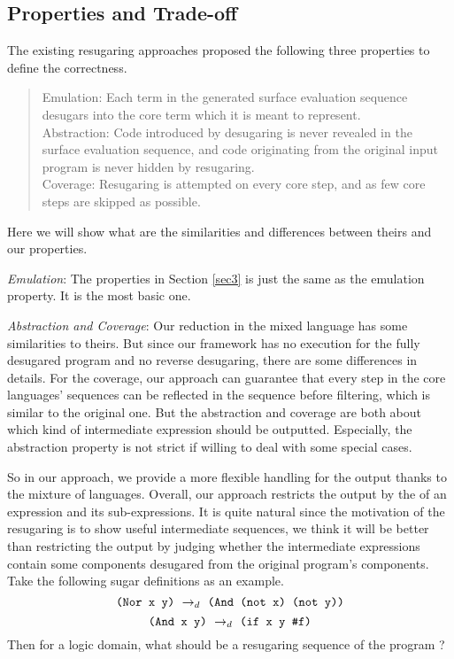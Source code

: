 \subsection{Properties and Trade-off}
\label{mark:correctness}

\todo{}

The existing resugaring approaches \cite{resugaring,hygienic} proposed the following three properties to define the correctness.

\begin{quote}
Emulation:
Each term in the generated surface evaluation sequence desugars into the core term which it is meant to represent.\\
Abstraction:
Code introduced by desugaring is never revealed in the surface evaluation sequence, and code originating from the original input program is never hidden by resugaring.\\
Coverage: Resugaring is attempted on every core step, and as few core steps are skipped as possible.\\
\end{quote}
Here we will show what are the similarities and differences between theirs and our properties.

\emph{Emulation}: The properties in Section \ref{sec3} is just the same as the emulation property. It is the most basic one.

\emph{Abstraction and Coverage}: Our reduction in the mixed language has some similarities to theirs. But since our framework has no execution for the fully desugared program and no reverse desugaring, there are some differences in details. For the coverage, our approach can guarantee that every step in the core languages' sequences can be reflected in the sequence before filtering, which is similar to the original one. But the abstraction and coverage are both about which kind of intermediate expression should be outputted. Especially, the abstraction property is not strict if willing to deal with some special cases.

So in our approach, we provide a more flexible handling for the output thanks to the mixture of languages. Overall, our approach restricts the output by the  of an expression and its sub-expressions. It is quite natural since the motivation of the resugaring is to show useful intermediate sequences, we think it will be better than restricting the output by judging whether the intermediate expressions contain some components desugared from the original program's components. Take the following sugar definitions as an example.
\[
\texttt{(Nor~x~y)} ~\rightarrow_d~ \texttt{(And~(not~x)~(not~y))}
\]
\[
\texttt{(And~x~y)} ~\rightarrow_d~ \texttt{(if~x~y~\#f)}
\]
Then for a logic domain, what should be a resugaring sequence of the program  ?

